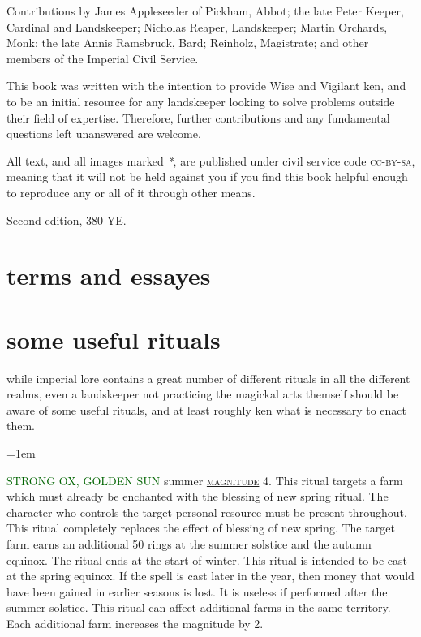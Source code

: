 \documentclass[twoside,11pt,b5paper]{scrbook}
\newcommand{\keyword}[1]{%
  \textcolor{darkgreen}{\expandafter\MakeUppercase{#1}}%
}
\newcommand{\moreindentpar}{\par\hangindent=1em\setlength{\parindent}{2em}}
\renewcommand{\paragraph}[1]{%
  \endarticle%
  \par\hangindent=1em\noindent%
  \let\localpar\moreindentpar
  \markboth{#1}{#1}%
  {\keyword{#1}}\label{#1}%
  \renewcommand{\endarticle}{}
}
\newcommand{\endarticle}{}
\newcommand{\s}[1]{{\textsc{\textcolor{marron}{\hyperref[#1]{#1}}}}}
\begin{document}
\begin{uppertitleback}{}
Contributions by James Appleseeder of Pickham, Abbot; the late Peter Keeper, Cardinal and Lands\-keeper; Nicholas Reaper, Lands\-keeper; Martin Orchards, Monk; the late Annis Ramsbruck, Bard; Reinholz, Magistrate; and other members of the Imperial Civil Service.

This book was written with the intention to provide Wise and Vigilant ken, and to be an initial resource for any landskeeper looking to solve problems outside their field of expertise. Therefore, further contributions and any fundamental questions left unanswered are welcome.

All text, and all images marked \textit{*}, are published under civil service code \textsc{cc-by-sa}, meaning that it will not be held against you if you find this book helpful enough to reproduce any or all of it through other means.

Second edition, 380 YE.
\end{uppertitleback}
\setlength{\parindent}{1em}

\listoftables

\chapter{terms and essayes}
\begin{multicols}{2}

\end{multicols}

\chapter{some useful rituals}
\label{appendix}
while imperial lore contains a great number of different rituals in all the different realms, even a landskeeper not practicing the magickal arts themself should be aware of some useful rituals, and at least roughly ken what is necessary to enact them.
\paragraph{strong ox, golden sun} summer \s{magnitude} 4. This ritual targets a farm which must already be enchanted with the blessing of new spring ritual. The character who controls the target personal resource must be present throughout. This ritual completely replaces the effect of blessing of new spring. The target farm earns an additional 50 rings at the summer solstice and the autumn equinox. The ritual ends at the start of winter. This ritual is intended to be cast at the spring equinox. If the spell is cast later in the year, then money that would have been gained in earlier seasons is lost. It is useless if performed after the summer solstice. This ritual can affect additional farms in the same territory. Each additional farm increases the magnitude by 2.
\end{document}
